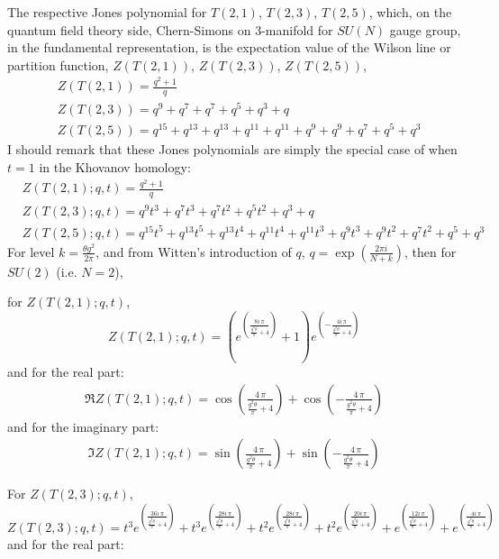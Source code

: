 \documentclass[10pt]{amsart}
\begin{document}
\begin{multicols}{2}
The respective Jones polynomial for $T(2,1)$, $T(2,3)$, $T(2,5)$, which, on the quantum field theory side, Chern-Simons on 3-manifold for $SU(N)$ gauge group, in the fundamental representation, is the expectation value of the Wilson line or partition function, $Z(T(2,1))$, $Z(T(2,3))$, $Z(T(2,5))$,
\[
\begin{aligned}
  & Z(T(2,1)) = \frac{q^{2} + 1}{q}    \\
  & Z(T(2,3)) = q^{9}  + q^{7}  + q^{7}  + q^{5}  + q^{3} + q \\  
  & Z(T(2,5)) = q^{15}  + q^{13}  + q^{13}  + q^{11}  + q^{11}  + q^{9}  + q^{9}  + q^{7}  + q^{5} + q^{3}  
\end{aligned}
\]
I should remark that these Jones polynomials are simply the special case of when $t=1$ in the Khovanov homology:
\[
\begin{aligned}
  & Z(T(2,1);q,t) = \frac{q^{2} + 1}{q}    \\
  & Z(T(2,3);q,t) = q^{9} t^{3} + q^{7} t^{3} + q^{7} t^{2} + q^{5} t^{2} + q^{3} + q \\  
  & Z(T(2,5);q,t) = q^{15} t^{5} + q^{13} t^{5} + q^{13} t^{4} + q^{11} t^{4} + q^{11} t^{3} + q^{9} t^{3} + q^{9} t^{2} + q^{7} t^{2} + q^{5} + q^{3}  
\end{aligned}
\]
For level $k = \frac{\theta g^2}{2\pi}$, and from Witten's introduction \cite{Witten:1988hf} of $q$, $q = \exp{ \left( \frac{2\pi i}{ N+k} \right)}$, then for $SU(2)$ (i.e. $N=2$),

for $Z(T(2,1);q,t)$,
\[
Z(T(2,1);q,t) = {\left(e^{\left(\frac{8 i \, \pi}{\frac{g^{2} \theta}{\pi} + 4}\right)} + 1\right)} e^{\left(-\frac{4 i \, \pi}{\frac{g^{2} \theta}{\pi} + 4}\right)}
\]
and for the real part:
\[
\begin{gathered}
\Re Z(T(2,1);q,t) =   \cos\left(\frac{4 \, \pi}{\frac{g^{2} \theta}{\pi} + 4}\right) + \cos\left(-\frac{4 \, \pi}{\frac{g^{2} \theta}{\pi} + 4}\right)
  \end{gathered}
\]
and for the imaginary part:
\[
\begin{gathered}
  \Im Z(T(2,1);q,t) = \sin\left(\frac{4 \, \pi}{\frac{g^{2} \theta}{\pi} + 4}\right) + \sin\left(-\frac{4 \, \pi}{\frac{g^{2} \theta}{\pi} + 4}\right)
  \end{gathered}
\]

For $Z(T(2,3);q,t)$,
\[
Z(T(2,3);q,t) = t^{3} e^{\left(\frac{36 i \, \pi}{\frac{g^{2} \theta}{\pi} + 4}\right)} + t^{3} e^{\left(\frac{28 i \, \pi}{\frac{g^{2} \theta}{\pi} + 4}\right)} + t^{2} e^{\left(\frac{28 i \, \pi}{\frac{g^{2} \theta}{\pi} + 4}\right)} + t^{2} e^{\left(\frac{20 i \, \pi}{\frac{g^{2} \theta}{\pi} + 4}\right)} + e^{\left(\frac{12 i \, \pi}{\frac{g^{2} \theta}{\pi} + 4}\right)} + e^{\left(\frac{4 i \, \pi}{\frac{g^{2} \theta}{\pi} + 4}\right)}
\]
and for the real part:


  \end{multicols}
\end{document}
